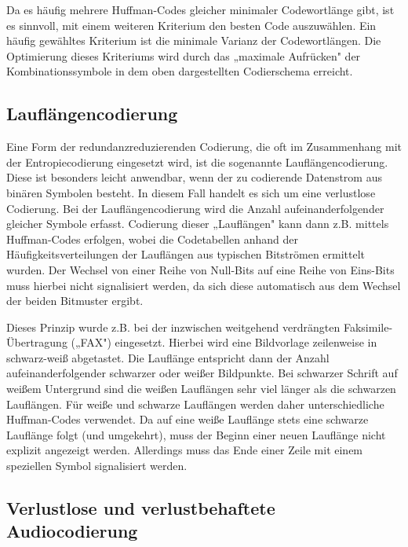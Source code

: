 Da es häufig mehrere Huffman-Codes gleicher minimaler Codewortlänge gibt, ist es sinnvoll, mit einem weiteren Kriterium den besten Code auszuwählen. Ein häufig gewähltes Kriterium ist die minimale Varianz der Codewortlängen. Die Optimierung dieses Kriteriums wird durch das „maximale Aufrücken" der Kombinationssymbole in dem oben dargestellten Codierschema erreicht.

\subsection{Lauflängencodierung}
\label{sec:laufllaengencodierung}

Eine Form der redundanzreduzierenden Codierung, die oft im Zusammenhang mit der Entropiecodierung eingesetzt wird, ist die sogenannte Lauflängencodierung. Diese ist besonders leicht anwendbar, wenn der zu codierende Datenstrom aus binären Symbolen besteht. In diesem Fall handelt es sich um eine verlustlose Codierung. Bei der Lauflängencodierung wird die Anzahl aufeinanderfolgender gleicher Symbole erfasst. Codierung dieser „Lauflängen" kann dann z.B. mittels Huffman-Codes erfolgen, wobei die Codetabellen anhand der Häufigkeitsverteilungen der Lauflängen aus typischen Bitströmen ermittelt wurden. Der Wechsel von einer Reihe von Null-Bits auf eine Reihe von Eins-Bits muss hierbei nicht signalisiert werden, da sich diese automatisch aus dem Wechsel der beiden Bitmuster ergibt.

Dieses Prinzip wurde z.B. bei der inzwischen weitgehend verdrängten Faksimile-Übertragung („FAX") eingesetzt. Hierbei wird eine Bildvorlage zeilenweise in schwarz-weiß abgetastet. Die Lauflänge entspricht dann der Anzahl aufeinanderfolgender schwarzer oder weißer Bildpunkte. Bei schwarzer Schrift auf weißem Untergrund sind die weißen Lauflängen sehr viel länger als die schwarzen Lauflängen. Für weiße und schwarze Lauflängen werden daher unterschiedliche Huffman-Codes verwendet. Da auf eine weiße Lauflänge stets eine schwarze Lauflänge folgt (und umgekehrt), muss der Beginn einer neuen Lauflänge nicht explizit angezeigt werden. Allerdings muss das Ende einer Zeile mit einem speziellen Symbol signalisiert werden.


\subsection{Verlustlose und verlustbehaftete Audiocodierung}
\label{sec:audiocodierung}

